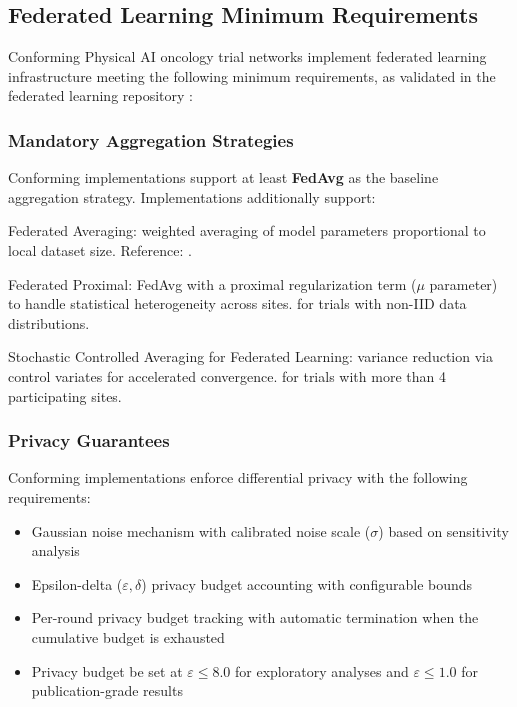\documentclass[11pt,letterpaper]{article}
\begin{document}
\subsection{Federated Learning Minimum Requirements}

Conforming Physical AI oncology trial networks \SHALL{} implement federated learning infrastructure meeting the following minimum requirements, as validated in the federated learning repository \cite{kawchak2026fl}:

\subsubsection{Mandatory Aggregation Strategies}

Conforming implementations \SHALL{} support at least \textbf{FedAvg} as the baseline aggregation strategy. Implementations \SHOULD{} additionally support:

\begin{description}[leftmargin=2.5cm, style=sameline]
  \item[FedAvg] Federated Averaging: weighted averaging of model parameters proportional to local dataset size. Reference: .
  \item[FedProx] Federated Proximal: FedAvg with a proximal regularization term ($\mu$ parameter) to handle statistical heterogeneity across sites. \RECOMMENDED{} for trials with non-IID data distributions.
  \item[SCAFFOLD] Stochastic Controlled Averaging for Federated Learning: variance reduction via control variates for accelerated convergence. \RECOMMENDED{} for trials with more than 4 participating sites.
\end{description}

\subsubsection{Privacy Guarantees}

Conforming implementations \SHALL{} enforce differential privacy with the following requirements:

\begin{itemize}
  \item Gaussian noise mechanism with calibrated noise scale ($\sigma$) based on sensitivity analysis
  \item Epsilon-delta ($\varepsilon, \delta$) privacy budget accounting with configurable bounds
  \item Per-round privacy budget tracking with automatic termination when the cumulative budget is exhausted
  \item Privacy budget \SHALL{} be set at $\varepsilon \leq 8.0$ for exploratory analyses and $\varepsilon \leq 1.0$ for publication-grade results
\end{itemize}
\end{document}
